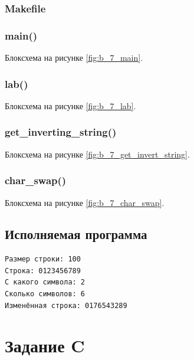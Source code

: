 \documentclass[12pt, a4paper]{article}
\begin{document}
\subsubsection{Makefile}


\subsubsection{main()}
Блоксхема на рисунке \ref{fig:b_7_main}.



\subsubsection{lab()}
Блоксхема на рисунке \ref{fig:b_7_lab}.



\subsubsection{get\_inverting\_string()}
Блоксхема на рисунке \ref{fig:b_7_get_invert_string}.



\subsubsection{char\_swap()}
Блоксхема на рисунке \ref{fig:b_7_char_swap}.



\subsection{Исполняемая программа}

\begin{verbatim}
Размер строки: 100
Строка: 0123456789
С какого символа: 2
Сколько символов: 6
Изменённая строка: 0176543289
\end{verbatim}

\labconclusion{}

\newpage

\section{Задание C}
\end{document}

